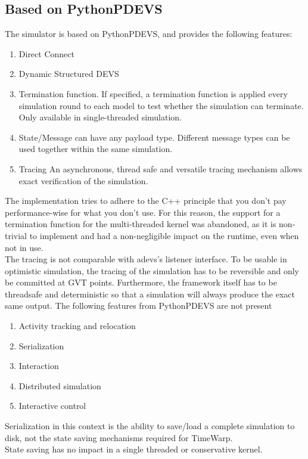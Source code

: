 \subsection{Based on PythonPDEVS}
The simulator is based on PythonPDEVS, and provides the following features: 
\begin{enumerate}
	\item Direct Connect
	\item Dynamic Structured DEVS
	\item Termination function. If specified, a termination function is applied every simulation round to each model to test whether the simulation can terminate. Only available in single-threaded simulation.
	\item State/Message can have any payload type. Different message types can be used together within the same simulation.
	\item Tracing An asynchronous, thread safe and versatile tracing mechanism allows exact verification of the simulation.
\end{enumerate}
The implementation tries to adhere to the C++ principle that you don't pay performance-wise for what you don't use. For this reason, the support for a termination function for the multi-threaded kernel was abandoned, as it is non-trivial to implement and had a non-negligible impact on the runtime, even when not in use.\\
The tracing is not comparable with adevs's listener interface. To be usable in optimistic simulation, the tracing of the simulation has to be reversible and only be committed at GVT points. Furthermore, the framework itself has to be threadsafe and deterministic so that a simulation will always produce the exact same output.
The following features from PythonPDEVS are not present
\begin{enumerate}
	\item Activity tracking and relocation
	\item Serialization
	\item Interaction 
	\item Distributed simulation
	\item Interactive control
\end{enumerate}
Serialization in this context is the ability to save/load a complete simulation to disk, not the state saving mechanisms required for TimeWarp.\\ State saving has no impact in a single threaded or conservative kernel.\\

